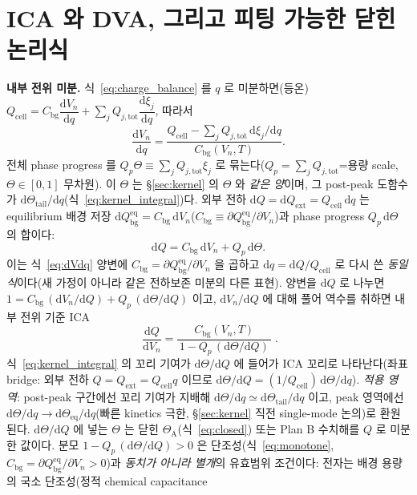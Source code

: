 \documentclass[11pt,a4paper]{article}
\newcommand{\dd}{\mathrm{d}}
\newcommand{\eq}{\mathrm{eq}}
\newcommand{\bg}{\mathrm{bg}}
\newcommand{\cell}{\mathrm{cell}}
\newcommand{\ext}{\mathrm{ext}}
\newcommand{\tot}{\mathrm{tot}}
\begin{document}
\section{ICA 와 DVA, 그리고 피팅 가능한 닫힌 논리식}\label{sec:fiteq}
\textbf{내부 전위 미분.} 식~\eqref{eq:charge_balance} 를 $q$ 로 미분하면(등온)
$Q_\cell=C_\bg\dfrac{\dd V_n}{\dd q}+\sum_j Q_{j,\tot}\dfrac{\dd\xi_j}{\dd q}$,
따라서
\begin{equation}
\frac{\dd V_n}{\dd q}=\frac{Q_\cell-\sum_j Q_{j,\tot}\,\dd\xi_j/\dd q}{C_\bg(V_n,T)}.
\label{eq:dVdq}
\end{equation}
전체 phase progress 를 $Q_p\Theta\equiv\sum_j Q_{j,\tot}\xi_j$ 로 묶는다($Q_p=\sum_j Q_{j,\tot}$=용량 scale,
$\Theta\in[0,1]$ 무차원). 이 $\Theta$ 는 \S\ref{sec:kernel} 의 $\Theta$ 와 \emph{같은 양}이며, 그 post-peak
도함수가 $\dd\Theta_\mathrm{tail}/\dd q$(식~\eqref{eq:kernel_integral})다. 외부 전하 $\dd Q=\dd Q_\ext=
Q_\cell\,\dd q$ 는 equilibrium 배경 저장 $\dd Q_\bg^{\eq}=C_\bg\,\dd V_n$($C_\bg\equiv\partial Q_\bg^{\eq}/\partial V_n$)과
phase progress $Q_p\,\dd\Theta$ 의 합이다:
\begin{equation}
\dd Q=C_\bg\,\dd V_n+Q_p\,\dd\Theta.
\label{eq:dQsplit}
\end{equation}
이는 식~\eqref{eq:dVdq} 양변에 $C_\bg=\partial Q_\bg^{\eq}/\partial V_n$ 을 곱하고 $\dd q=\dd Q/Q_\cell$ 로 다시 쓴
\emph{동일식}이다(새 가정이 아니라 같은 전하보존 미분의 다른 표현). 양변을 $\dd Q$ 로 나누면 $1=C_\bg\,(\dd V_n/\dd Q)+Q_p\,(\dd\Theta/\dd Q)$ 이고, $\dd V_n/\dd Q$ 에 대해 풀어
역수를 취하면 내부 전위 기준 ICA
\begin{equation}
\boxed{\;\frac{\dd Q}{\dd V_n}=\frac{C_\bg(V_n,T)}{\,1-Q_p\,(\dd\Theta/\dd Q)\,}\;.}
\label{eq:fiteq}
\end{equation}
식~\eqref{eq:kernel_integral} 의 꼬리 기여가 $\dd\Theta/\dd Q$ 에 들어가 ICA 꼬리로 나타난다(좌표 bridge:
외부 전하 $Q=Q_\ext=Q_\cell q$ 이므로 $\dd\Theta/\dd Q=(1/Q_\cell)\,\dd\Theta/\dd q$). \emph{적용 영역}: post-peak
구간에선 꼬리 기여가 지배해 $\dd\Theta/\dd q\simeq\dd\Theta_\mathrm{tail}/\dd q$ 이고, peak 영역에선
$\dd\Theta/\dd q\to\dd\Theta_\eq/\dd q$(빠른 kinetics 극한, \S\ref{sec:kernel} 직전 single-mode 논의)로 환원된다.
$\dd\Theta/\dd Q$ 에 넣는 $\Theta$ 는 닫힌 $\Theta_\mathrm A$(식~\eqref{eq:closed}) 또는 Plan B 수치해를 $Q$ 로
미분한 값이다. 분모
$1-Q_p\,(\dd\Theta/\dd Q)>0$ 은 단조성(식~\eqref{eq:monotone}, $C_\bg=\partial Q_\bg^{\eq}/\partial V_n>0$)과
\emph{동치가 아니라 별개}의 유효범위 조건이다: 전자는 배경 용량의 국소 단조성(정적 chemical capacitance
\end{document}
